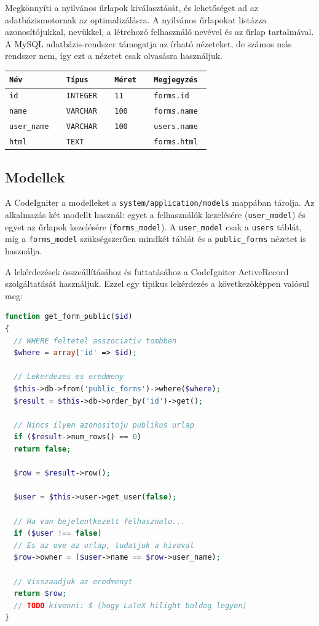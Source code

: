 \documentclass[12pt,a4paper,twoside]{article}
\begin{document}
Megkönnyíti a nyilvános űrlapok kiválasztását, és lehetőséget ad az
adatbázismotornak az optimalizálásra. A nyilvános űrlapokat listázza
azonosítójukkal, nevükkel, a létrehozó felhasználó nevével és az űrlap
tartalmával. A MySQL adatbázis-rendszer támogatja az írható nézeteket, de számos
más rendszer nem, így ezt a nézetet csak olvasásra használjuk.

\small
\vspace{.3cm}
\begin{tabular*}{\textwidth}{>{\tt}l>{\tt}l>{\tt}l|>{\tt}l}
  \rm Név     &  \rm Típus    &  \rm Méret  & Megjegyzés \\
  \hline
  id         &  INTEGER      &  11         & forms.id   \\
  name       &  VARCHAR      &  100        & forms.name \\
  user\_name &  VARCHAR      &  100        & users.name \\
  html       &  TEXT         &             & forms.html
\end{tabular*}
\normalsize


\subsection{Modellek}
\label{sec:modellek}

A CodeIgniter a modelleket a \texttt{system/application/models} mappában
tárolja. Az alkalmazás két modellt használ: egyet a felhasználók kezelésére
(\texttt{user\_model}) és egyet az űrlapok kezelésére (\texttt{forms\_model}). A
\texttt{user\_model} csak a \texttt{users} táblát, míg a
\texttt{forms\_model} szükségszerűen mindkét táblát és a \texttt{public\_forms}
nézetet is használja.

A lekérdezések összeállításához és futtatásához a CodeIgniter ActiveRecord
szolgáltatását használjuk. Ezzel egy tipikus lekérdezés a következőképpen
valósul meg:

\begin{lstlisting}[language=PHP]
function get_form_public($id)
{
  // WHERE feltetel asszociativ tombben
  $where = array('id' => $id);

  // Lekerdezes es eredmeny
  $this->db->from('public_forms')->where($where);
  $result = $this->db->order_by('id')->get();

  // Nincs ilyen azonositoju publikus urlap
  if ($result->num_rows() == 0)
  return false;

  $row = $result->row();

  $user = $this->user->get_user(false);

  // Ha van bejelentkezett felhasznalo...
  if ($user !== false)
  // Es az ove az urlap, tudatjuk a hivoval
  $row->owner = ($user->name == $row->user_name);

  // Visszaadjuk az eredmenyt
  return $row;
  // TODO kivenni: $ (hogy LaTeX hilight boldog legyen)
}
\end{lstlisting}
\vspace{.8cm}
\end{document}
